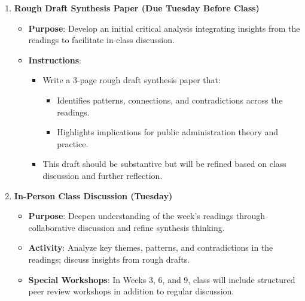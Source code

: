 \documentclass[12pt, letterpaper]{article}
\begin{document}
\begin{enumerate}
    \item \textbf{Rough Draft Synthesis Paper (Due Tuesday Before Class)}
    \begin{itemize}
        \item \textbf{Purpose}: Develop an initial critical analysis integrating insights from the readings to facilitate in-class discussion.
        \item \textbf{Instructions}:
        \begin{itemize}
            \item Write a 3-page rough draft synthesis paper that:
            \begin{itemize}
                \item Identifies patterns, connections, and contradictions across the readings.
                \item Highlights implications for public administration theory and practice.
            \end{itemize}
            \item This draft should be substantive but will be refined based on class discussion and further reflection.
        \end{itemize}
    \end{itemize}

    \item \textbf{In-Person Class Discussion (Tuesday)}
    \begin{itemize}
        \item \textbf{Purpose}: Deepen understanding of the week's readings through collaborative discussion and refine synthesis thinking.
        \item \textbf{Activity}: Analyze key themes, patterns, and contradictions in the readings; discuss insights from rough drafts.
        \item \textbf{Special Workshops}: In Weeks 3, 6, and 9, class will include structured peer review workshops in addition to regular discussion.
    \end{itemize}


\end{enumerate}
\end{document}
